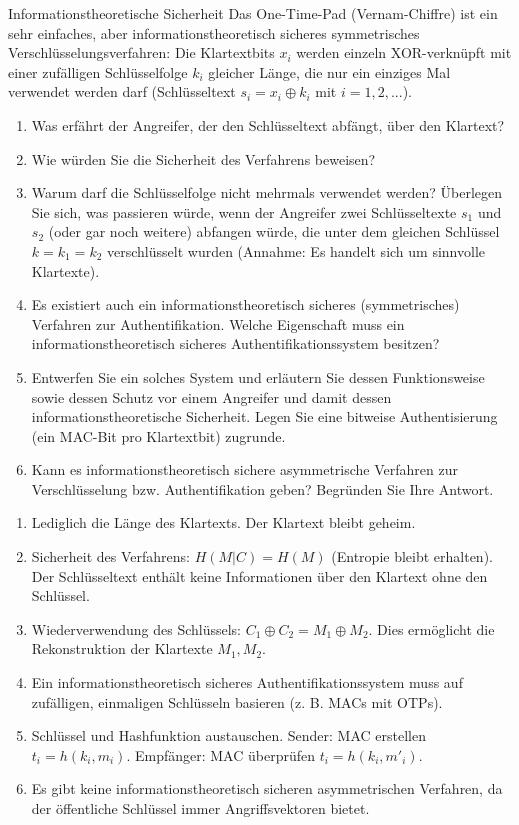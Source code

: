 \documentclass{article}
\begin{document}
\begin{exercise}{Informationstheoretische Sicherheit}\label{ex:otp}
  Das One-Time-Pad (Vernam-Chiffre) ist ein sehr einfaches, aber informationstheoretisch sicheres symmetrisches Verschlüsselungsverfahren: Die Klartextbits $x_i$ werden einzeln XOR-verknüpft mit einer zufälligen Schlüsselfolge $k_i$ gleicher Länge, die nur ein einziges Mal verwendet werden darf (Schlüsseltext $s_i = x_i \oplus k_i$ mit $i= 1,2,...$).
  \begin{enumerate}
    \item Was erfährt der Angreifer, der den Schlüsseltext abfängt, über den Klartext?
    \item Wie würden Sie die Sicherheit des Verfahrens beweisen?
    \item Warum darf die Schlüsselfolge nicht mehrmals verwendet werden? Überlegen Sie sich, was passieren würde, wenn der Angreifer zwei Schlüsseltexte $s_1$ und $s_2$ (oder gar noch weitere) abfangen würde, die unter dem gleichen Schlüssel $k= k_1 = k_2$ verschlüsselt wurden (Annahme: Es handelt sich um sinnvolle Klartexte).
    \item Es existiert auch ein informationstheoretisch sicheres (symmetrisches) Verfahren zur Authentifikation. Welche Eigenschaft muss ein informationstheoretisch sicheres Authentifikationssystem besitzen?
    \item Entwerfen Sie ein solches System und erläutern Sie dessen Funktionsweise sowie dessen Schutz vor einem Angreifer und damit dessen informationstheoretische Sicherheit. Legen Sie eine bitweise Authentisierung (ein MAC-Bit pro Klartextbit) zugrunde.
    \item Kann es informationstheoretisch sichere asymmetrische Verfahren zur Verschlüsselung bzw. Authentifikation geben? Begründen Sie Ihre Antwort.
  \end{enumerate}

  \begin{solution}
    \begin{enumerate}
        \item Lediglich die Länge des Klartexts. Der Klartext bleibt geheim.
        \item Sicherheit des Verfahrens: $H(M|C) = H(M)$ (Entropie bleibt erhalten). Der Schlüsseltext enthält keine Informationen über den Klartext ohne den Schlüssel.
        \item Wiederverwendung des Schlüssels: $C_1 \oplus C_2 = M_1 \oplus M_2$. Dies ermöglicht die Rekonstruktion der Klartexte $M_1, M_2$.
        \item Ein informationstheoretisch sicheres Authentifikationssystem muss auf zufälligen, einmaligen Schlüsseln basieren (z. B. MACs mit OTPs).
        \item Schlüssel und Hashfunktion austauschen. Sender: MAC erstellen $t_i=h(k_i, m_i)$. Empfänger: MAC überprüfen $t_i=h(k_i, m'_i)$.
        \item Es gibt keine informationstheoretisch sicheren asymmetrischen Verfahren, da der öffentliche Schlüssel immer Angriffsvektoren bietet.
    \end{enumerate}
  \end{solution}
\end{exercise}
\end{document}
